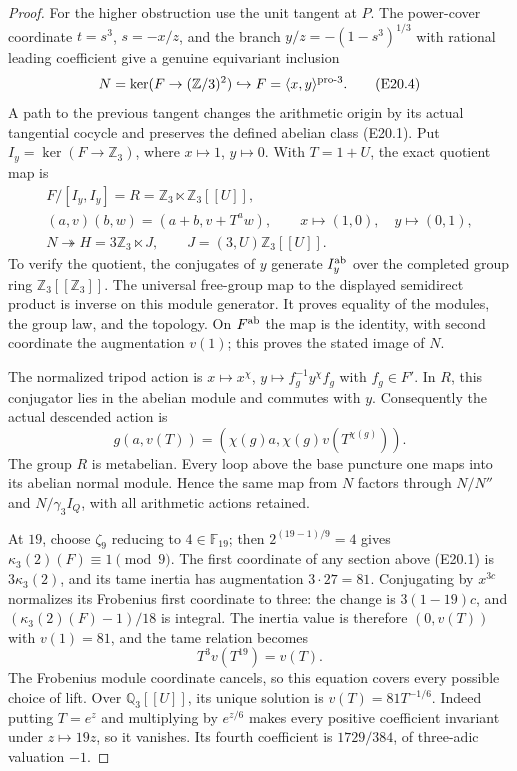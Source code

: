 \begin{proof}
For the higher obstruction use the unit tangent
at $P$. The power-cover coordinate $t=s^3$,
$s=-x/z$, and the branch
$y/z=-(1-s^3)^{1/3}$ with rational leading
coefficient give a genuine equivariant inclusion
\[
 N=\ker(F\to(\mathbb Z/3)^2)\hookrightarrow
       F=\langle x,y\rangle^{\rm pro\text{-}3}.
 \tag{E20.4}
\]
A path to the previous tangent changes the
arithmetic origin by its actual tangential
cocycle and preserves the defined abelian
class (E20.1). Put $I_y=\ker(F\to\mathbb Z_3)$,
where $x\mapsto1$, $y\mapsto0$. With $T=1+U$,
the exact quotient map is
\[
 \begin{gathered}
 F/[I_y,I_y]=R=\mathbb Z_3\ltimes\mathbb Z_3[[U]],\\
 (a,v)(b,w)=(a+b,v+T^a w),\qquad
 x\mapsto(1,0),\quad y\mapsto(0,1),\\
 N\twoheadrightarrow H=3\mathbb Z_3\ltimes J,
            \qquad J=(3,U)\mathbb Z_3[[U]].
 \end{gathered}
 \tag{E20.5}
\]
To verify the quotient, the conjugates of $y$
generate $I_y^{\rm ab}$ over the completed
group ring $\mathbb Z_3[[\mathbb Z_3]]$.
The universal free-group map to the displayed
semidirect product is inverse on this module
generator. It proves equality of the modules,
the group law, and the topology. On
$F^{\rm ab}$ the map is the identity, with
second coordinate the augmentation $v(1)$;
this proves the stated image of $N$.

The normalized tripod action is
$x\mapsto x^\chi$, $y\mapsto f_g^{-1}y^\chi f_g$
with $f_g\in F'$. In $R$, this conjugator lies
in the abelian module and commutes with $y$.
Consequently the actual descended action is
\[
           g(a,v(T))=(\chi(g)a,\chi(g)v(T^{\chi(g)})).
 \tag{E20.6}
\]
The group $R$ is metabelian. Every loop above
the base puncture one maps into its abelian
normal module. Hence the same map from $N$
factors through $N/N''$ and $N/\gamma_3I_Q$,
with all arithmetic actions retained.

At $19$, choose $\zeta_9$ reducing to
$4\in\mathbb F_{19}$; then
$2^{(19-1)/9}=4$ gives
$\kappa_3(2)(F)\equiv1\pmod9$.
The first coordinate of any section above
(E20.1) is $3\kappa_3(2)$, and its tame inertia
has augmentation $3\cdot27=81$.
Conjugating by $x^{3c}$ normalizes its Frobenius
first coordinate to three: the change is
$3(1-19)c$, and
$(\kappa_3(2)(F)-1)/18$ is integral.
The inertia value is therefore $(0,v(T))$
with $v(1)=81$, and the tame relation becomes
\[
                         T^3v(T^{19})=v(T).
 \tag{E20.7}
\]
The Frobenius module coordinate cancels, so this
equation covers every possible choice of lift.
Over $\mathbb Q_3[[U]]$, its unique solution is
$v(T)=81T^{-1/6}$. Indeed putting $T=e^z$ and
multiplying by $e^{z/6}$ makes every positive
coefficient invariant under $z\mapsto19z$,
so it vanishes. Its fourth coefficient is
$1729/384$, of three-adic valuation $-1$.


\end{proof}
